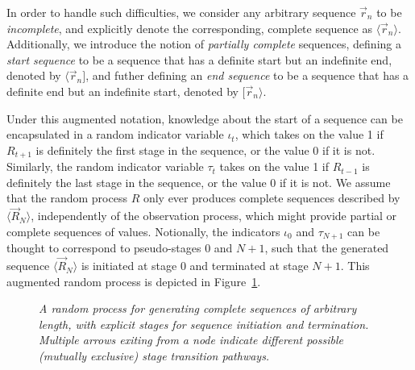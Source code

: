 \documentclass[a4paper]{article}
\begin{document}
In order to handle such difficulties, we consider any arbitrary sequence $\vec{r}_n$ to be {\em incomplete},
and explicitly denote the corresponding, complete sequence as $\langle\vec{r}_n\rangle$.
Additionally, we introduce the notion of {\em partially complete} sequences, 
defining a {\em start sequence} to be a sequence that has a definite start but an indefinite end,
denoted by $\langle\vec{r}_n]$, and futher defining an {\em end sequence} to be a sequence
that has a definite end but an indefinite start, denoted by $[\vec{r}_n\rangle$.

Under this augmented notation, knowledge about the start of a sequence can be encapsulated in 
a random indicator variable $\iota_t$, which takes on the value 1 if $R_{t+1}$ is definitely the first stage in the
sequence, or the value 0 if it is not. Similarly, the random indicator variable $\tau_{t}$
takes on the value 1 if $R_{t-1}$ is definitely the last stage in the sequence, or the value 0 if it is not.
We assume that the random process $R$ only ever produces complete sequences described by $\langle\vec{R}_N\rangle$,
independently of the observation process, which might provide partial or complete sequences of values.
Notionally, the indicators $\iota_0$ and $\tau_{N+1}$ can be thought to correspond to pseudo-stages 0 and $N+1$, such that
the generated sequence $\langle\vec{R}_N\rangle$ is initiated at stage 0 and terminated at stage $N+1$.
This augmented random process is depicted in Figure~\ref{fig:random-process}. 
\begin{figure}[hbt]
\centering
{}
\caption{\em A random process for generating complete sequences of arbitrary length,
with explicit stages for sequence initiation and termination. Multiple arrows exiting from a node indicate
different possible (mutually exclusive) stage transition pathways.}
\label{fig:random-process}
\end{figure}
\end{document}
